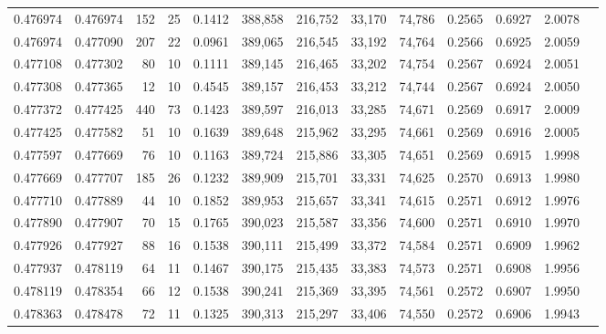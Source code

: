 \begin{tabular}{rrrrrrrrrrrrr}
0.476974 & 0.476974 &   152 &  25 &                                     0.1412 & 388,858 & 216,752 &  33,170 &  74,786 & 0.2565 & 0.6927 & 2.0078 \\
0.476974 & 0.477090 &   207 &  22 &                                     0.0961 & 389,065 & 216,545 &  33,192 &  74,764 & 0.2566 & 0.6925 & 2.0059 \\
0.477108 & 0.477302 &    80 &  10 &                                     0.1111 & 389,145 & 216,465 &  33,202 &  74,754 & 0.2567 & 0.6924 & 2.0051 \\
0.477308 & 0.477365 &    12 &  10 &                                     0.4545 & 389,157 & 216,453 &  33,212 &  74,744 & 0.2567 & 0.6924 & 2.0050 \\
0.477372 & 0.477425 &   440 &  73 &                                     0.1423 & 389,597 & 216,013 &  33,285 &  74,671 & 0.2569 & 0.6917 & 2.0009 \\
0.477425 & 0.477582 &    51 &  10 &                                     0.1639 & 389,648 & 215,962 &  33,295 &  74,661 & 0.2569 & 0.6916 & 2.0005 \\
0.477597 & 0.477669 &    76 &  10 &                                     0.1163 & 389,724 & 215,886 &  33,305 &  74,651 & 0.2569 & 0.6915 & 1.9998 \\
0.477669 & 0.477707 &   185 &  26 &                                     0.1232 & 389,909 & 215,701 &  33,331 &  74,625 & 0.2570 & 0.6913 & 1.9980 \\
0.477710 & 0.477889 &    44 &  10 &                                     0.1852 & 389,953 & 215,657 &  33,341 &  74,615 & 0.2571 & 0.6912 & 1.9976 \\
0.477890 & 0.477907 &    70 &  15 &                                     0.1765 & 390,023 & 215,587 &  33,356 &  74,600 & 0.2571 & 0.6910 & 1.9970 \\
0.477926 & 0.477927 &    88 &  16 &                                     0.1538 & 390,111 & 215,499 &  33,372 &  74,584 & 0.2571 & 0.6909 & 1.9962 \\
0.477937 & 0.478119 &    64 &  11 &                                     0.1467 & 390,175 & 215,435 &  33,383 &  74,573 & 0.2571 & 0.6908 & 1.9956 \\
0.478119 & 0.478354 &    66 &  12 &                                     0.1538 & 390,241 & 215,369 &  33,395 &  74,561 & 0.2572 & 0.6907 & 1.9950 \\
0.478363 & 0.478478 &    72 &  11 &                                     0.1325 & 390,313 & 215,297 &  33,406 &  74,550 & 0.2572 & 0.6906 & 1.9943 \\

\end{tabular}

